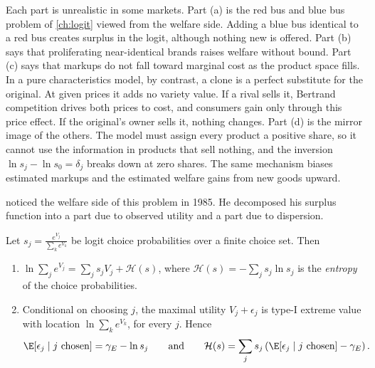 Each part is unrealistic in some markets. Part (a) is the red bus and blue bus problem of \cref{ch:logit} viewed
from the welfare side. Adding a blue bus identical to a red bus creates surplus in the logit, although nothing new
is offered. Part (b) says that proliferating near-identical brands raises welfare without bound. Part (c) says that
markups do not fall toward marginal cost as the product space fills. In a pure characteristics model, by contrast,
a clone is a perfect substitute for the original. At given prices it adds no variety value. If a rival sells it,
Bertrand competition drives both prices to cost, and consumers gain only through this price effect. If the
original's owner sells it, nothing changes. Part (d) is the mirror image of the others. The model must assign every
product a positive share, so it cannot use the information in products that sell nothing, and the inversion $\ln
s_j - \ln s_0 = \delta_j$ breaks down at zero shares. The same mechanism biases estimated markups and the
estimated welfare gains from new goods upward.

\citet[p.~18]{Trajtenberg1985} noticed the welfare side of this problem in 1985. He decomposed his surplus function
into a part due to observed utility and a part due to dispersion.

\begin{proposition}\label{prop:10-entropy}
Let $s_j = \frac{e^{V_j}}{\sum_k e^{V_k}}$ be logit choice probabilities over a finite choice set. Then
\begin{enumerate}[label=(\alph*)]
\item $\ln\sum_j e^{V_j} = \sum_j s_jV_j + \mathcal{H}(s)$, where $\mathcal{H}(s) = -\sum_j s_j\ln s_j$ is the
\emph{entropy} of the choice probabilities.
\item Conditional on choosing $j$, the maximal utility $V_j + \epsilon_j$ is type-I extreme value with location
$\ln\sum_k e^{V_k}$, for every $j$. Hence
\begin{equation*}
\E[\epsilon_j\mid j\text{ chosen}] = \gamma_E - \ln s_j
\qquad\text{and}\qquad
\mathcal{H}(s) = \sum_j s_j\left(\E[\epsilon_j\mid j\text{ chosen}] - \gamma_E\right).
\end{equation*}
\end{enumerate}
\end{proposition}

